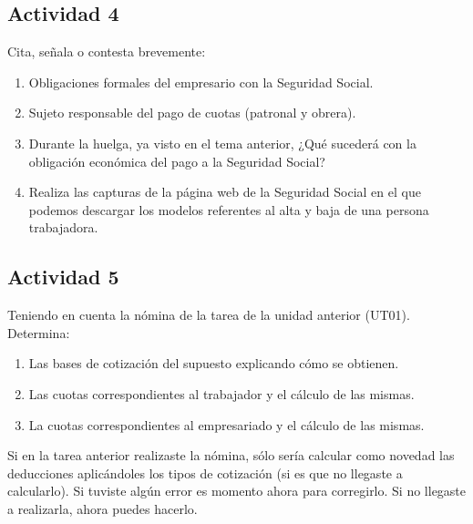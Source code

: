 \subsection{Actividad 4}
Cita, señala o contesta brevemente:

\begin{enumerate}
    \item Obligaciones formales del empresario con la Seguridad Social.
    \item Sujeto responsable del pago de cuotas (patronal y obrera).
    \item Durante la huelga, ya visto en el tema anterior, ¿Qué sucederá con la obligación económica del pago a la Seguridad Social?
    \item Realiza las capturas de la página web de la Seguridad Social en el que  podemos descargar los modelos referentes al alta y baja de una persona trabajadora.
\end{enumerate}

\subsection{Actividad 5}
Teniendo en cuenta la nómina de la tarea de la unidad anterior (UT01). Determina:

\begin{enumerate}[label=\alph*)]
    \item Las bases de cotización del supuesto explicando cómo se obtienen.
    \item Las cuotas correspondientes al trabajador y el cálculo de las mismas.
    \item La cuotas correspondientes al empresariado y el cálculo de las mismas.
\end{enumerate}

Si en la tarea anterior realizaste la nómina, sólo sería calcular como novedad las deducciones aplicándoles los tipos de cotización (si es que no llegaste a calcularlo). Si tuviste algún error es momento ahora para corregirlo. Si no llegaste a realizarla, ahora puedes hacerlo.

